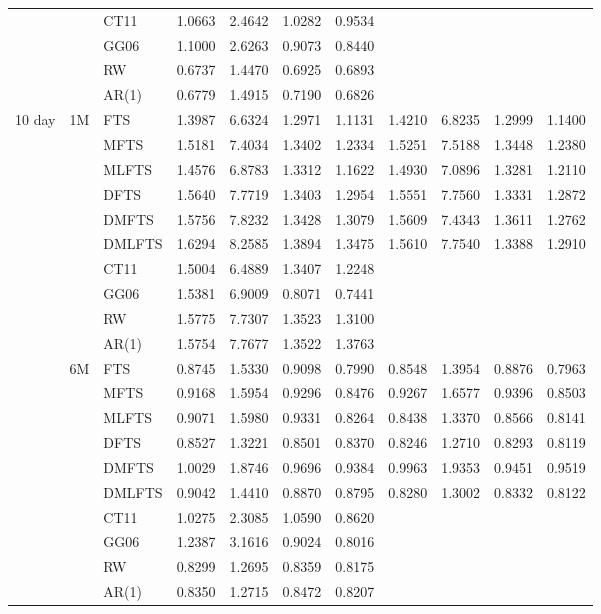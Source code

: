 \documentclass[12pt,a4paper]{article}
\begin{document}
\begin{center}
\begin{small}
\begin{longtable}{@{}lllcccccccc@{}}
& & CT11 & 1.0663 & 2.4642 & 1.0282 & 0.9534 \\
& & GG06 & 1.1000 & 2.6263 & 0.9073 & 0.8440 \\
& & RW & 0.6737 & 1.4470 & 0.6925 & 0.6893 \\
& & AR(1) & 0.6779 & 1.4915 & 0.7190 & 0.6826 \\
  \midrule
  10 day & 1M & FTS  & 1.3987 & 6.6324 & 1.2971 & 1.1131 & 1.4210 & 6.8235 & 1.2999 & 1.1400 \\ 
& & MFTS & 1.5181 & 7.4034 & 1.3402 & 1.2334 & 1.5251 & 7.5188 & 1.3448 & 1.2380 \\
& & MLFTS & 1.4576 & 6.8783 & 1.3312 & 1.1622 & 1.4930 & 7.0896 & 1.3281 & 1.2110 \\
 & & DFTS & 1.5640 & 7.7719 & 1.3403 & 1.2954 & 1.5551 & 7.7560 & 1.3331 & 1.2872 \\ 
& & DMFTS & 1.5756 & 7.8232 & 1.3428 & 1.3079 & 1.5609 & 7.4343 & 1.3611 & 1.2762 \\
& & DMLFTS & 1.6294 & 8.2585 & 1.3894 & 1.3475 & 1.5610 & 7.7540 & 1.3388 & 1.2910 \\
& & CT11 & 1.5004 & 6.4889 & 1.3407 & 1.2248 \\
& & GG06 & 1.5381 & 6.9009 & 0.8071 & 0.7441 \\
& & RW & 1.5775 & 7.7307 & 1.3523 & 1.3100 \\
& & AR(1) & 1.5754 & 7.7677 & 1.3522 & 1.3763 \\
 \cmidrule{2-11}
   & 6M & FTS & 0.8745 & 1.5330 & 0.9098 & 0.7990 & 0.8548 & 1.3954 & 0.8876 & 0.7963 \\ 
& & MFTS & 0.9168 & 1.5954 & 0.9296 & 0.8476 & 0.9267 & 1.6577 & 0.9396 & 0.8503 \\
& & MLFTS & 0.9071 & 1.5980 & 0.9331 & 0.8264 & 0.8438 & 1.3370 & 0.8566 & 0.8141 \\
& & DFTS & 0.8527 & 1.3221 & 0.8501 & 0.8370 & 0.8246 & 1.2710 & 0.8293 & 0.8119 \\ 
& & DMFTS & 1.0029 & 1.8746 & 0.9696 & 0.9384 & 0.9963 & 1.9353 & 0.9451 & 0.9519 \\
& & DMLFTS & 0.9042 & 1.4410 & 0.8870 & 0.8795 & 0.8280 & 1.3002 & 0.8332 & 0.8122  \\
& & CT11 & 1.0275 & 2.3085 & 1.0590 & 0.8620 \\
& & GG06 & 1.2387 & 3.1616 & 0.9024 & 0.8016 \\
& & RW & 0.8299 & 1.2695 & 0.8359 & 0.8175 \\
& & AR(1) & 0.8350 & 1.2715 & 0.8472 & 0.8207 \\

\end{longtable}
\end{small}
\end{center}
\end{document}
